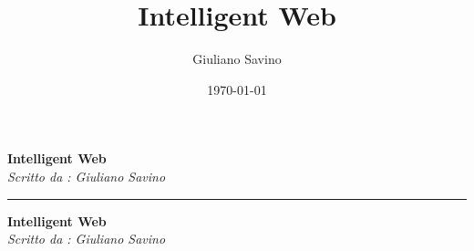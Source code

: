 \documentclass{csnotes}
\title{Intelligent Web}
\author{Giuliano Savino}
\date{\today}
\begin{document}
\thispagestyle{empty}
\begin{flushright}
    \small
    \textbf{Intelligent Web}\\
    \textit{Scritto da : Giuliano Savino}
\end{flushright}

\vspace{-0.15cm}
\noindent
\textcolor{blue!60!black}{\rule{\textwidth}{1.2pt}}
\vfill
\begin{center}

    {\Large \textbf{Intelligent Web}}\\[0.2cm]
        
    {\large \textit{Scritto da : Giuliano Savino}}

\end{center}

\vfill

\tableofcontents
\newpage





\end{document}

